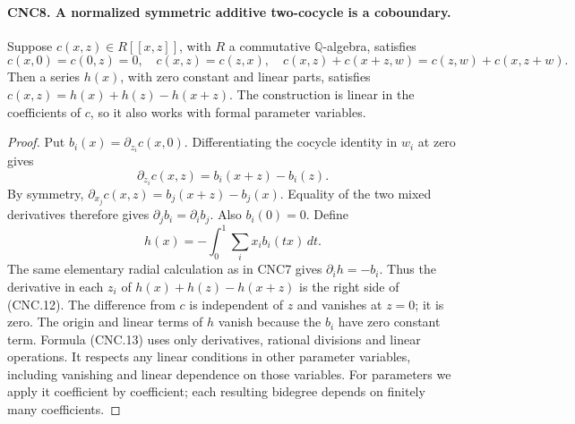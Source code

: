 \documentclass[11pt,a4paper]{article}
\numberwithin{equation}{section}
\theoremstyle{remark}\newtheorem{remark}[theorem]{Remark}
\begin{document}
\paragraph{CNC8. A normalized symmetric additive two-cocycle is a coboundary.}
\label{claim:CNC8}
Suppose \(c(x,z)\in R[[x,z]]\), with \(R\) a commutative
\(\mathbb Q\)-algebra, satisfies
\[
 c(x,0)=c(0,z)=0,\quad c(x,z)=c(z,x),\quad
 c(x,z)+c(x+z,w)=c(z,w)+c(x,z+w).
\]
Then a series \(h(x)\), with zero constant and linear parts, satisfies
\(c(x,z)=h(x)+h(z)-h(x+z)\).
The construction is linear in the coefficients of \(c\), so it also
works with formal parameter variables.
\begin{proof}
Put \(b_i(x)=\partial_{z_i}c(x,0)\).  Differentiating the cocycle
identity in \(w_i\) at zero gives
\[
 \partial_{z_i}c(x,z)=b_i(x+z)-b_i(z).                        \tag{CNC.12}
\]
By symmetry,
\(\partial_{x_j}c(x,z)=b_j(x+z)-b_j(x)\).
Equality of the two mixed derivatives therefore gives
\(\partial_jb_i=\partial_ib_j\).  Also \(b_i(0)=0\).
Define
\[
 h(x)=-\int_0^1\sum_i x_i b_i(tx)\,dt.                       \tag{CNC.13}
\]
The same elementary radial calculation as in CNC7 gives
\(\partial_i h=-b_i\).  Thus the derivative in each \(z_i\)
of \(h(x)+h(z)-h(x+z)\) is the right side of (CNC.12).
The difference from \(c\) is independent of \(z\) and vanishes
at \(z=0\); it is zero.  The origin and linear terms of \(h\)
vanish because the \(b_i\) have zero constant term.  Formula
(CNC.13) uses only derivatives, rational divisions and linear
operations.  It respects any linear conditions in other parameter
variables, including vanishing and linear dependence on those
variables.  For parameters we apply it coefficient by coefficient;
each resulting bidegree depends on finitely many coefficients.
\end{proof}

\end{document}
